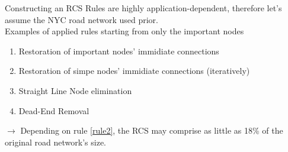 \begin{frame}{Constructing an RCS}
	Rules are highly application-dependent, therefore let's assume the NYC road network used prior. \\
	\vspace{0.2cm}
	Examples of applied rules starting from only the important nodes
	\begin{enumerate}
		\item Restoration of important nodes' immidiate connections 
		\item Restoration of simpe nodes' immidiate connections (iteratively)\label{rule2}
		\item Straight Line Node elimination
		\item Dead-End Removal
	\end{enumerate}
	\vspace{0.2cm}
	$\rightarrow$ Depending on rule \ref{rule2}, the RCS may comprise as little as 18\% of the original road network's size.
	
\end{frame}

